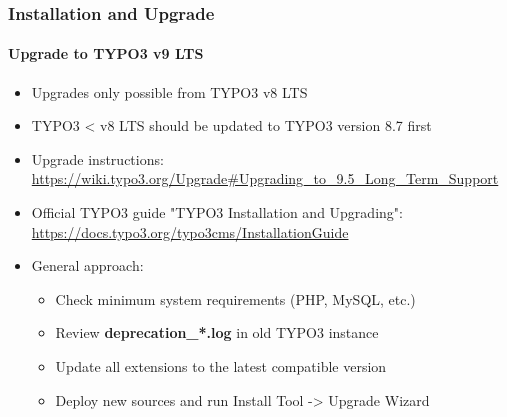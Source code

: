 \begin{frame}[fragile]
	\frametitle{Installation and Upgrade}
	\framesubtitle{Upgrade to TYPO3 v9 LTS}

	\begin{itemize}
		\item Upgrades only possible from TYPO3 v8 LTS
		\item TYPO3 < v8 LTS should be updated to TYPO3 version 8.7 first
	\end{itemize}

	\begin{itemize}

		\item Upgrade instructions:\newline
			\smaller\url{https://wiki.typo3.org/Upgrade#Upgrading_to_9.5_Long_Term_Support}\normalsize
		\item Official TYPO3 guide "TYPO3 Installation and Upgrading":
			\smaller\url{https://docs.typo3.org/typo3cms/InstallationGuide}\normalsize
		\item General approach:
			\begin{itemize}
				\item Check minimum system requirements \small(PHP, MySQL, etc.)
				\item Review \textbf{deprecation\_*.log} in old TYPO3 instance
				\item Update all extensions to the latest compatible version
				\item Deploy new sources and run Install Tool -> Upgrade Wizard
			\end{itemize}
	\end{itemize}

\end{frame}

